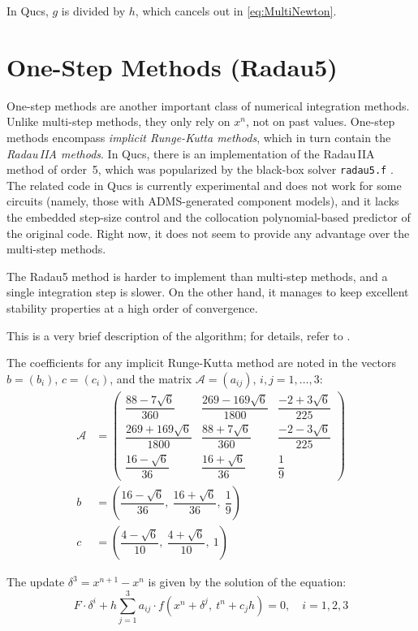 In Qucs, $g$ is divided by $h$, which cancels out in
\eqref{eq:MultiNewton}.

\section{One-Step Methods (Radau5)}

One-step methods are another important class of numerical integration
methods.  Unlike multi-step methods, they only rely on $x^n$, not on
past values.  One-step methods encompass \emph{implicit Runge-Kutta
  methods}, which in turn contain the \emph{Radau\,IIA methods}.  In
Qucs, there is an implementation of the Radau\,IIA method of order~5,
which was popularized by the black-box solver \texttt{radau5.f}
\cite{HairerWanner}.  The related code in Qucs is currently
experimental and does not work for some circuits (namely, those with
ADMS-generated component models), and it lacks the embedded step-size
control and the collocation polynomial-based predictor of the original
code.  Right now, it does not seem to provide any advantage over the
multi-step methods.

The Radau5 method is harder to implement than multi-step methods, and
a single integration step is slower.  On the other hand, it manages to
keep excellent stability properties at a high order of convergence.

This is a very brief description of the algorithm; for details, refer
to \cite{HairerWanner}.

The coefficients for any implicit Runge-Kutta method are noted in the
vectors $b=(b_i)$, $c=(c_i)$, and the matrix $\mathcal{A}=(a_{ij})$,
$i,j=1,\dotsc,3$:
\begin{align}
\mathcal{A}&=
\begin{pmatrix}
\dfrac{88-7\sqrt{6}}{360} & \dfrac{269-169\sqrt{6}}{1800} & \dfrac{-2+3\sqrt{6}}{225} \\[8pt]
\dfrac{269+169\sqrt{6}}{1800} & \dfrac{88+7\sqrt{6}}{360} & \dfrac{-2-3\sqrt{6}}{225} \\[8pt]
\dfrac{16-\sqrt{6}}{36} & \dfrac{16+\sqrt{6}}{36} & \dfrac{1}{9}
\end{pmatrix} \\
b&=\left(\dfrac{16-\sqrt{6}}{36},~ \dfrac{16+\sqrt{6}}{36},~\dfrac{1}{9}\right)\\
c&=\left(\dfrac{4-\sqrt{6}}{10},~\dfrac{4+\sqrt{6}}{10},~1\right)
\end{align}

The update $\delta^3=x^{n+1}-x^n$ is given by the
solution of the equation:
\begin{equation}
F\cdot \delta^i + h\sum_{j=1}^3 a_{ij}\cdot
f(x^n+\delta^j,~t^n+c_jh)=0,\quad
i=1,2,3
\end{equation}

